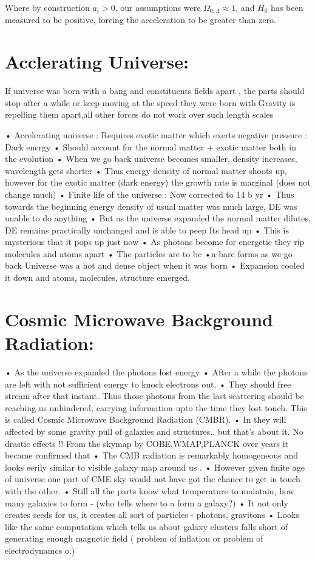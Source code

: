 \documentclass[10pt]{article}
\begin{document}
Where by construction $a_i>0$, our assumptions were $\Omega_{0, \Lambda} \approx 1$, and $H_0$ has been measured to be positive, forcing the acceleration to be greater than zero.

\section{Acclerating Universe: }
If universe was born with a bang and constituents fields apart , the parts should stop after a while or keep moving at the speed they were born with.Gravity is repelling them apart,all other forces do not work over such length scales

• Accelerating universe : Requires exotic matter which exerts negative pressure : Dark energy 
 • Should account for the normal matter + exotic matter both in the evolution 
 • When we go back universe becomes smaller, density increases, wavelength gets shorter 
 • Thus energy density of normal matter shoots up, however for the exotic matter (dark energy) 
 the growth rate is marginal (does not change much) 
 • Finite life of the universe : Now corrected to 14 b yr
 • Thus towards the beginning energy density of usual matter was much large, DE was unable to 
 do anything 
 • But as the universe expanded the normal matter dilutes, DE remains practically unchanged and 
 is able to peep Its head up 
 • This is mysterious that it pops up just now
 • As photons become for energetic they rip 
 molecules and atoms apart 
 • The particles are to be •n bare 
 forms as we go back 
 Universe was a hot and dense object when it 
 was born 
 • Expansion cooled it down and atoms, 
 molecules, structure emerged.

\section{ Cosmic Microwave Background Radiation:}
 • As the universe expanded the photons lost energy 
 • After a while the photons are left with not sufficient energy to knock electrons out. 
 • They should free stream after that instant. Thus those photons from the last scattering should 
 be reaching us unhindered, carrying information upto the time they lost touch. This is called 
 Cosmic Microwave Background Radiation (CMBR). 
 • In they will affected by some gravity pull of galaxies and structures.. but that's about 
 it. No drastic effects !!
From the skymap by COBE,WMAP,PLANCK over years it became confirmed that • The CMB radiation is remarkably homogeneous and looks eerily similar to visible galaxy map around us .
 • However given finite age of universe one part of CME sky would not have got the chance to get 
 in touch with the other. 
 • Still all the parts know what temperature to maintain, how many galaxies to form - (who tells 
 where to a form a galaxy?)
 • It not only creates seeds for us, it creates all sort of particles - photons, gravitons 
 • Looks like the same computation which tells us about galaxy clusters falls short of generating 
 enough magnetic field ( problem of inflation or problem of electrodynamcs o.) 
\end{document}
